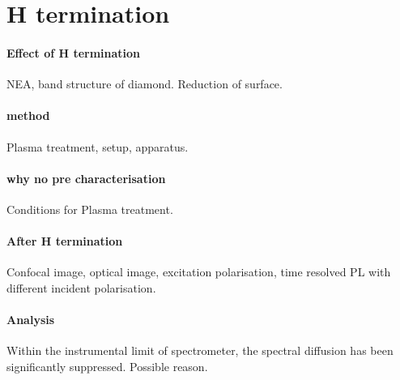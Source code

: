 \section[H termination]{H termination}
\paragraph{Effect of H termination}

NEA, band structure of diamond. Reduction of surface.
\paragraph{method} Plasma treatment, setup, apparatus.

\paragraph{why no pre characterisation} Conditions for Plasma treatment.

\paragraph{After H termination} Confocal image, optical image, excitation polarisation, time resolved PL with different incident polarisation.


\paragraph{Analysis} Within the instrumental limit of spectrometer, the spectral diffusion has been significantly suppressed. Possible reason.